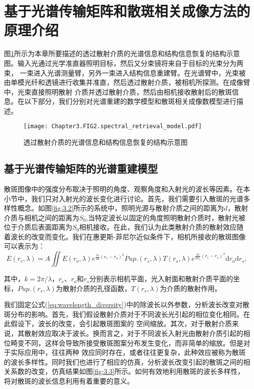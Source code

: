 \section{基于光谱传输矩阵和散斑相关成像方法的原理介绍}
图\ref{fig:3.1}所示为本章所要描述的透过散射介质的光谱信息和结构信息恢复的结构示意图。输入光通过光学准直器照明目标，然后又分束镜将来自于目标的光束分为两束，
一束进入光谱测量臂，另外一束进入结构信息重建臂。在光谱臂中，光束被由单模光纤和透镜进行收集并准直，然后透过散射介质，被相机所探测。在成像臂中，光束直接照明散射
介质并透过散射介质，然后由相机接收散射后的散斑信息。在以下部分，我们分别对光谱重建的数学模型和散斑相关成像数模型进行描述。
\begin{figure}[htp]
	\centering
	\texttt{[image: Chapter3.FIG2.spectral\_retrieval\_model.pdf]}
	\caption{透过散射介质的光谱信息和结构信息恢复的结构示意图}
	\label{fig:3.1}
\end{figure}

\subsection{基于光谱传输矩阵的光谱重建模型}
散斑图像中的强度分布取决于照明的角度、观察角度和入射光的波长等因素。在本小节中，我们只对入射光的波长变化进行讨论。首先，我们需要引入散斑的光谱多样性概念。如图\ref{fig:3.2}所示的系统中，照明光源与散射介质之间的距离为$d$，散射介质与相机之间的距离为$S_{0}$,当特定波长以固定的角度照明散射介质时，散射光被位于介质后表面距离为$S_{0}$相机接收。在此，我们认为此类散射介质的散射效应随着波长的改变而变化。我们在惠更斯-菲尼尔近似条件下，相机所接收的散斑图像可以表示为：
\begin{equation}
    E(r_{c},\lambda) = A\iint E(r_{o},\lambda)e^{\frac{ik}{2d}(r_{s}-r_{o})^{2}}Pup.(r_{s},\lambda)T(r_{s},\lambda)e^{\frac{ik}{2S_{o}}(r_{c}-r_{s})^{2}}\mathrm{d}{r_{o}}\mathrm{d}{r_{s}}
\label{eq:wavelength_diversity},
\end{equation}

其中，$k =2\pi/\lambda$，$r_{c}$、$r_{o}$和$r_{s}$分别表示相机平面，光入射面和散射介质平面的坐标，$Pup.(r_{s},\lambda)$为散射介质的孔径函数，$T(r_{s},\lambda)$为介质的散射作用。

我们固定公式(\ref{eq:wavelength_diversity})中的除波长以外参数，分析波长改变对散斑分布的影响。首先，我们假设散射介质对于不同波长光引起的相位变化相同。在此假设下，波长的改变，会引起散斑图案的
空间缩放。其次，对于散射介质来说，其散射效应取决于波长。换而言之，对于不同波长入射光由散射介质引起的相位畸变不同，这样会导致所接受散斑图案分布发生变化，而非简单的缩放。但是对于实际应用中，往往两种
效应同时存在，或者往往更复杂，此种效应被称为散斑的波长多样性。同时我们也进行了相应的仿真，分析波长改变引起的散斑之间的相关系数的改变，仿真结果如图\ref{fig:3.3}所示。如何有效地利用散斑的波长多样性，将对散斑的波长信息利用有着重要的意义。


